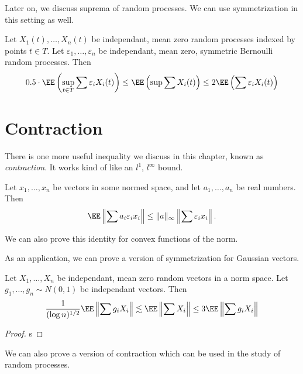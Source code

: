 Later on, we discuss suprema of random processes. We can use symmetrization in this setting as well.

\begin{lemma}
    Let $X_1(t), \dots, X_n(t)$ be independant, mean zero random processes indexed by points $t \in T$. Let $\varepsilon_1, \dots, \varepsilon_n$ be independant, mean zero, symmetric Bernoulli random processes. Then
    \[ 0.5 \cdot \EE \left( \sup_{t \in T} \sum \varepsilon_i X_i(t) \right) \leq \EE \left( \sup \sum X_i(t) \right) \leq 2 \EE \left( \sum \varepsilon_i X_i(t) \right) \]
\end{lemma}







\section{Contraction}

There is one more useful inequality we discuss in this chapter, known as {\it contraction}. It works kind of like an $l^1$, $l^\infty$ bound.

\begin{theorem}
    Let $x_1, \dots, x_n$ be vectors in some normed space, and let $a_1, \dots, a_n$ be real numbers. Then
    \[ \EE \left\| \sum a_i \varepsilon_i x_i \right\| \leq \| a \|_\infty \left\| \sum \varepsilon_i x_i \right\|. \]
\end{theorem}

\begin{remark}
    We can also prove this identity for convex functions of the norm.
\end{remark}

As an application, we can prove a version of symmetrization for Gaussian vectors.

\begin{theorem}
    Let $X_1, \dots, X_n$ be independant, mean zero random vectors in a norm space. Let $g_1, \dots, g_n \sim N(0,1)$ be independant vectors. Then
    \[ \frac{1}{(\log n)^{1/2}} \EE \left\| \sum g_i X_i \right\| \lesssim \EE \left\| \sum X_i \right\| \leq 3 \EE \left\| \sum g_i X_i \right\| \]
\end{theorem}
\begin{proof}
    s
\end{proof}

We can also prove a version of contraction which can be used in the study of random processes.

